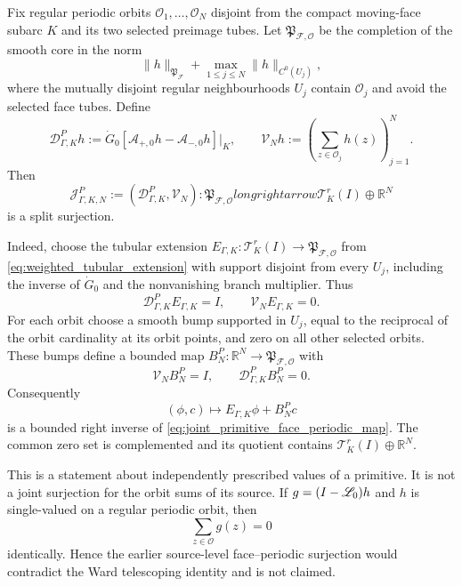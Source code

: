 \begin{corollary*}
Fix regular periodic orbits
\(\mathcal O_1,\ldots,\mathcal O_N\) disjoint from the compact moving-face
subarc \(K\) and its two selected preimage tubes.  Let
\(\mathfrak P_{\mathscr F,\mathcal O}\) be the completion of the smooth core
in the norm
\[
 \|h\|_{\mathfrak P_{\mathscr F}}
 +\max_{1\le j\le N}\|h\|_{C^0(U_j)},
\]
where the mutually disjoint regular neighbourhoods \(U_j\) contain
\(\mathcal O_j\) and avoid the selected face tubes.  Define
\[
 \mathcal D^P_{\Gamma,K}h
 :=\dot G_0[\mathcal A_{+,0}h-\mathcal A_{-,0}h]|_K,
 \qquad
 \mathcal V_Nh
 :=\left(\sum_{z\in\mathcal O_j}h(z)\right)_{j=1}^N.
\]
Then
\begin{equation}
\label{eq:joint_primitive_face_periodic_map}
 \mathcal J^P_{\Gamma,K,N}
 :=(\mathcal D^P_{\Gamma,K},\mathcal V_N):
 \mathfrak P_{\mathscr F,\mathcal O}longrightarrow
 \mathcal T_K^r(I)\oplus\mathbb R^N
\end{equation}
is a split surjection.

Indeed, choose the tubular extension
\(E_{\Gamma,K}:\mathcal T_K^r(I)\to
\mathfrak P_{\mathscr F,\mathcal O}\) from
\eqref{eq:weighted_tubular_extension} with support disjoint from every
\(U_j\), including the inverse of \(\dot G_0\) and the nonvanishing branch
multiplier.  Thus
\[
 \mathcal D^P_{\Gamma,K}E_{\Gamma,K}=I,
 \qquad \mathcal V_NE_{\Gamma,K}=0.
\]
For each orbit choose a smooth bump supported in \(U_j\), equal to the
reciprocal of the orbit cardinality at its orbit points, and zero on all
other selected orbits.  These bumps define a bounded map
\(B_N^P:\mathbb R^N\to\mathfrak P_{\mathscr F,\mathcal O}\) with
\[
 \mathcal V_NB_N^P=I,
 \qquad \mathcal D^P_{\Gamma,K}B_N^P=0.
\]
Consequently
\begin{equation}
\label{eq:joint_primitive_face_periodic_right_inverse}
 (\phi,c)\longmapsto E_{\Gamma,K}\phi+B_N^Pc
\end{equation}
is a bounded right inverse of
\eqref{eq:joint_primitive_face_periodic_map}.  The common zero set is
complemented and its quotient contains
\(\mathcal T_K^r(I)\oplus\mathbb R^N\).

This is a statement about independently prescribed values of a primitive.
It is not a joint surjection for the orbit sums of its source.  If
\(g=(I-\mathscr L_0)h\) and \(h\) is single-valued on a regular periodic
orbit, then
\[
 \sum_{z\in\mathcal O}g(z)=0
\]
identically.  Hence the earlier source-level face--periodic surjection would
contradict the Ward telescoping identity and is not claimed.
\end{corollary*}
